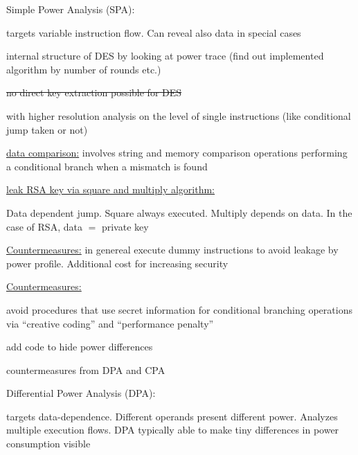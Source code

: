\documentclass[landscape, a4paper]{article}
\begin{document}
\begin{minipage}[t]{0.2\pagewidth}
\begin{betterlist}
\begin{betterlist}
			\item \alert{Simple Power Analysis (SPA):}
			\begin{betterlist}
				\item targets variable instruction flow. Can reveal also data in special cases
				\item internal structure of \alert{DES} by looking at power trace (find out implemented algorithm by number of rounds etc.)
				\begin{betterlist}
					\item \sout{no direct key extraction possible for \alert{DES}}
				\end{betterlist}
				\item with higher resolution analysis on the level of single instructions (like conditional jump taken or not)
				\item \underline{data comparison:} involves string and memory comparison operations performing a conditional branch when a mismatch is found
				\item \underline{leak RSA key via square and multiply algorithm:}
				\begin{betterlist}
					\item Data dependent jump. Square always executed. Multiply depends on data. In the case of RSA, data $=$ private key
					\item \underline{Countermeasures:} in genereal execute dummy instructions to avoid leakage by power profile. Additional cost for increasing security
				\end{betterlist}
				\item \underline{Countermeasures:}
				\begin{betterlist}
					\item avoid procedures that use secret information for conditional branching operations via \enquote{creative coding} and \enquote{performance penalty}
					\item add code to hide power differences
					\item countermeasures from DPA and CPA
				\end{betterlist}
			\end{betterlist}
			\item \alert{Differential Power Analysis (DPA):}
			\begin{betterlist}
				\item targets data-dependence. Different operands present different power. Analyzes multiple execution flows. DPA typically able to make tiny differences in power consumption visible

\end{betterlist}
\end{betterlist}
\end{betterlist}
\end{minipage}
\end{document}
